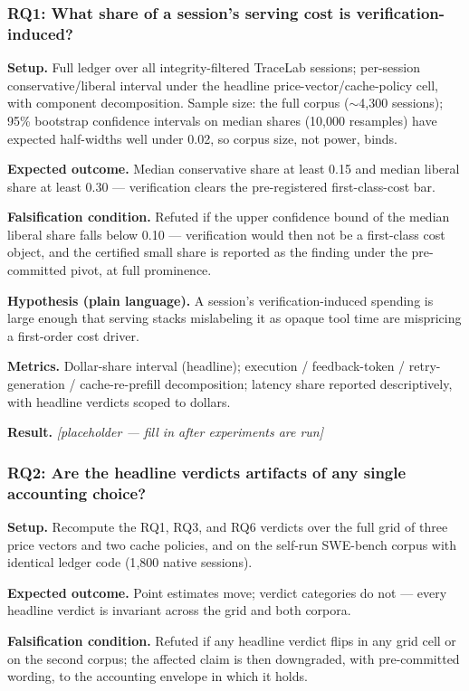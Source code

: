 \documentclass[11pt]{article}
\newcommand{\ph}{\textit{[placeholder --- fill in after experiments are run]}}
\begin{document}
\subsubsection{RQ1: What share of a session's serving cost is verification-induced?}

\textbf{Setup.} Full ledger over all integrity-filtered TraceLab sessions; per-session conservative/liberal interval under the headline price-vector/cache-policy cell, with component decomposition. Sample size: the full corpus ($\sim$4{,}300 sessions); 95\% bootstrap confidence intervals on median shares (10{,}000 resamples) have expected half-widths well under 0.02, so corpus size, not power, binds.

\textbf{Expected outcome.} Median conservative share at least 0.15 and median liberal share at least 0.30 --- verification clears the pre-registered first-class-cost bar.

\textbf{Falsification condition.} Refuted if the upper confidence bound of the median liberal share falls below 0.10 --- verification would then not be a first-class cost object, and the certified small share is reported as the finding under the pre-committed pivot, at full prominence.

\textbf{Hypothesis (plain language).} A session's verification-induced spending is large enough that serving stacks mislabeling it as opaque tool time are mispricing a first-order cost driver.

\textbf{Metrics.} Dollar-share interval (headline); execution / feedback-token / retry-generation / cache-re-prefill decomposition; latency share reported descriptively, with headline verdicts scoped to dollars.

\textbf{Result.} \ph

\subsubsection{RQ2: Are the headline verdicts artifacts of any single accounting choice?}

\textbf{Setup.} Recompute the RQ1, RQ3, and RQ6 verdicts over the full grid of three price vectors and two cache policies, and on the self-run SWE-bench corpus with identical ledger code (1{,}800 native sessions).

\textbf{Expected outcome.} Point estimates move; verdict categories do not --- every headline verdict is invariant across the grid and both corpora.

\textbf{Falsification condition.} Refuted if any headline verdict flips in any grid cell or on the second corpus; the affected claim is then downgraded, with pre-committed wording, to the accounting envelope in which it holds.
\end{document}

